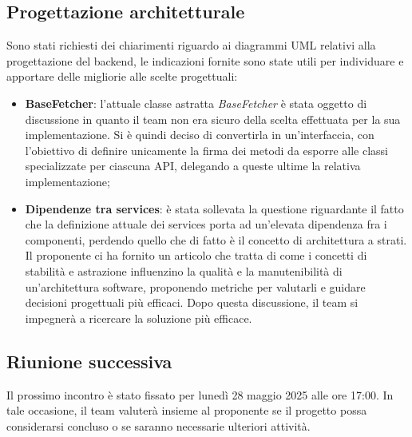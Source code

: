 \subsection{Progettazione architetturale}
Sono stati richiesti dei chiarimenti riguardo ai diagrammi UML relativi alla progettazione del backend, le indicazioni fornite sono state utili per individuare e apportare delle migliorie alle scelte progettuali:
\begin{itemize}
    \item \textbf{BaseFetcher}: l'attuale classe astratta \textit{BaseFetcher} è stata oggetto di discussione in quanto il team non era sicuro della scelta effettuata per la sua implementazione. Si è quindi deciso di convertirla in un'interfaccia, con l'obiettivo di definire unicamente la firma dei metodi da esporre alle classi specializzate per ciascuna API, delegando a queste ultime la relativa implementazione;
    \item \textbf{Dipendenze tra services}: è stata sollevata la questione riguardante il fatto che la definizione attuale dei services porta ad un'elevata dipendenza fra i componenti, perdendo quello che di fatto è il concetto di architettura a strati. Il proponente ci ha fornito un articolo che tratta di come i concetti di stabilità e astrazione influenzino la qualità e la manutenibilità di un'architettura software, proponendo metriche per valutarli e guidare decisioni progettuali più efficaci. Dopo questa discussione, il team si impegnerà a ricercare la soluzione più efficace.
\end{itemize}

\subsection{Riunione successiva}
Il prossimo incontro è stato fissato per lunedì 28 maggio 2025 alle ore 17:00. In tale occasione, il team valuterà insieme al proponente se il progetto possa considerarsi concluso o se saranno necessarie ulteriori attività.